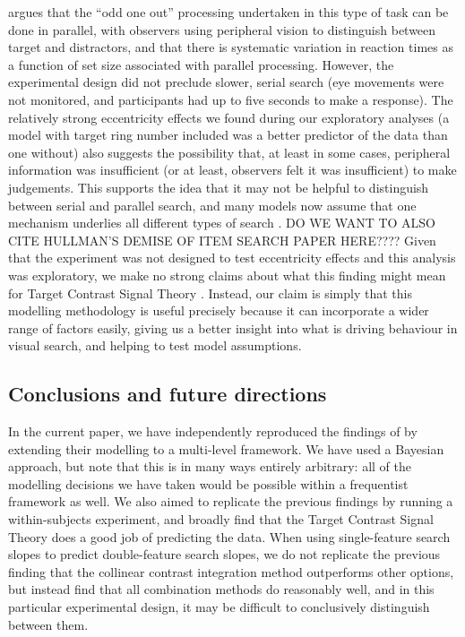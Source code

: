 \documentclass[preprint,12pt,authoryear]{elsarticle}
\begin{document}
\citep{buetti2019predicting} argues that the ``odd one out'' processing undertaken in this type of task can be done in parallel, with observers using peripheral vision to distinguish between target and distractors, and that there is systematic variation in reaction times as a function of set size associated with parallel processing. However, the experimental design did not preclude slower, serial search (eye movements were not monitored, and participants had up to five seconds to make a response). The relatively strong eccentricity effects we found during our exploratory analyses (a model with target ring number included was a better predictor of the data than one without) also suggests the possibility that, at least in some cases, peripheral information was insufficient (or at least, observers felt it was insufficient) to make judgements. This supports the idea that it may not be helpful to distinguish between serial and parallel search, and many models now assume that one mechanism underlies all different types of search \citep{wolfe1998can}. DO WE WANT TO ALSO CITE HULLMAN'S DEMISE OF ITEM SEARCH PAPER HERE???? Given that the experiment was not designed to test eccentricity effects and this analysis was exploratory, we make no strong claims about what this finding might mean for Target Contrast Signal Theory \cite{lleras2020target}. Instead, our claim is simply that this modelling methodology is useful precisely because it can incorporate a wider range of factors easily, giving us a better insight into what is driving behaviour in visual search, and helping to test model assumptions.

\subsection{Conclusions and future directions}

In the current paper, we have independently reproduced the findings of \cite{buetti2019predicting} by extending their modelling to a multi-level framework. We have used a Bayesian approach, but note that this is in many ways entirely arbitrary: all of the modelling decisions we have taken would be possible within a frequentist framework as well. We also aimed to replicate the previous findings by running a within-subjects experiment, and broadly find that the Target Contrast Signal Theory does a good job of predicting the data. When using single-feature search slopes to predict double-feature search slopes, we do not replicate the previous finding that the collinear contrast integration method outperforms other options, but instead find that all combination methods do reasonably well, and in this particular experimental design, it may be difficult to conclusively distinguish between them.
\end{document}
